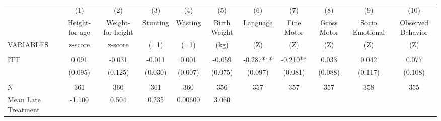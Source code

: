 \begin{tabular}{lcccccccccc} \hline
 & (1) & (2) & (3) & (4) & (5) & (6) & (7) & (8) & (9) & (10) \\
 & Height-for-age & Weight-for-height & Stunting & Wasting & Birth Weight & Language & Fine Motor & Gross Motor & Socio Emotional & Observed Behavior \\
VARIABLES & z-score & z-score & (=1) & (=1) & (kg) & (Z) & (Z) & (Z) & (Z) & (Z) \\ \hline
 &  &  &  &  &  &  &  &  &  &  \\
ITT & 0.091 & -0.031 & -0.011 & 0.001 & -0.059 & -0.287*** & -0.210** & 0.033 & 0.042 & 0.077 \\
 & (0.095) & (0.125) & (0.030) & (0.007) & (0.075) & (0.097) & (0.081) & (0.088) & (0.117) & (0.108) \\
 &  &  &  &  &  &  &  &  &  &  \\
N & 361 & 360 & 361 & 360 & 356 & 357 & 357 & 357 & 358 & 355 \\
 Mean Late Treatment & -1.100 & 0.504 & 0.235 & 0.00600 & 3.060 &  &  &  &  &  \\ \hline
\end{tabular}
